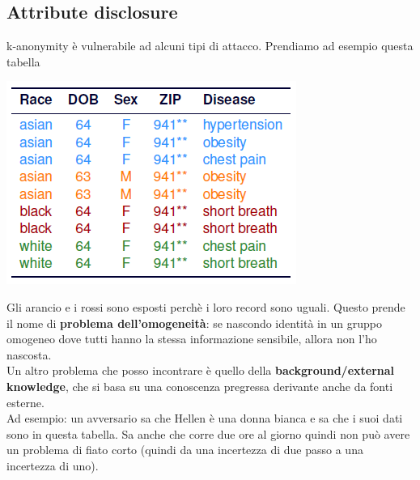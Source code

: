 \subsection{Attribute disclosure}
k-anonymity è vulnerabile ad alcuni tipi di attacco. Prendiamo ad esempio questa tabella
\begin{center}
    \includegraphics[scale=0.6]{img/kanonprob.png}
\end{center}
Gli arancio e i rossi sono esposti perchè i loro record sono uguali. Questo prende il nome di \textbf{problema dell'omogeneità}: se nascondo identità in un gruppo omogeneo dove tutti hanno la stessa informazione sensibile, allora non l'ho nascosta.\\
Un altro problema che posso incontrare è quello della \textbf{background/external knowledge}, che si basa su una conoscenza pregressa derivante anche da fonti esterne.\\
Ad esempio: un avversario sa che Hellen è una donna bianca e sa che i suoi dati sono in questa tabella. Sa anche che corre due ore al giorno quindi non può avere un problema di fiato corto (quindi da una incertezza di due passo a una incertezza di uno).

